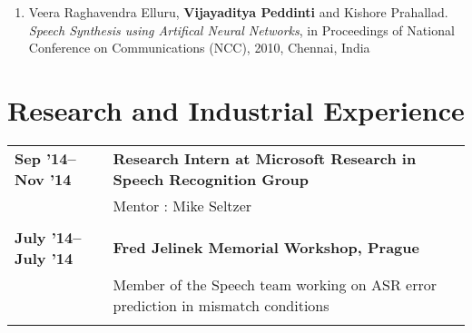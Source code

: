 \documentclass[margin,line,pifont,palatino,courier]{res}
\begin{document}
\begin{resume}
\begin{enumerate}
\item Veera Raghavendra Elluru, \textbf{Vijayaditya Peddinti} and Kishore Prahallad.
\textit{Speech Synthesis using Artifical Neural Networks}, in Proceedings of National Conference on Communications (NCC), 2010, Chennai, India
\end{enumerate}
\section{\sc Research and Industrial Experience}

\begin{longtable}{@{}p{1.2in}p{3.8in}}

\textbf{Sep '14--Nov '14} & \textbf{Research Intern at Microsoft Research in Speech Recognition Group} \\
& Mentor : Mike Seltzer \\
&\\

\textbf{July '14--July '14} & \textbf{Fred Jelinek Memorial Workshop, Prague} \\
& Member of the Speech team working on ASR error prediction in mismatch conditions \\
&\\


\end{longtable}
\end{resume}
\end{document}
